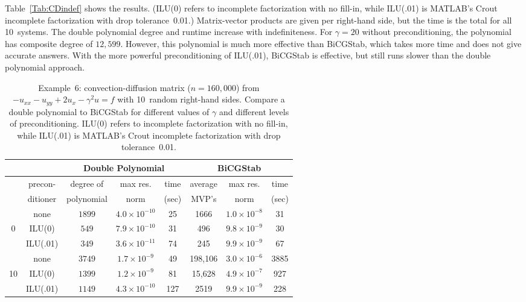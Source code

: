 \documentclass{siamart}
\begin{document}
Table~\ref{Tab:CDindef} shows the results.  (ILU(0) refers to incomplete factorization with no fill-in, while ILU(.01) is MATLAB's Crout incomplete factorization with drop tolerance~0.01.)
Matrix-vector products are given per right-hand side, but the time is the total for all 10~systems.
The double polynomial degree and runtime increase with indefiniteness.  For $\gamma=20$ without preconditioning, the polynomial has composite degree of $12{,}599$.  However, this polynomial is much more effective than BiCGStab, which takes more time and does not give accurate answers.  With the more powerful preconditioning of ILU(.01), BiCGStab is effective, but still runs slower than the double polynomial approach.  

\begin{table}
\caption{Example~6: convection-diffusion matrix ($n=160{,}000$) from $- u_{xx} - u_{yy} + 2 u_{x} - \gamma^2 u = f $ with 10~random right-hand sides.  Compare  a double polynomial to BiCGStab for different values of $\gamma$ and different levels of preconditioning.  ILU(0) refers to incomplete factorization with no fill-in, while ILU(.01) is MATLAB's Crout incomplete factorization with drop tolerance~0.01.}

\vspace*{-3pt}
\begin{center}
\begin{tabular}{|c|c|c|c|c||c|c|c|}  \hline\hline
& & \multicolumn{3}{|c||}{Double Polynomial}                  &  \multicolumn{3}{|c|}{BiCGStab }              \\  \hline
\smash{\raisebox{-5pt}{$\gamma$}} & precon-  & degree of    & max res.          & time          & average       & max res.          & time      \\ 
                          & ditioner             & polynomial    & norm              & \small{(sec)}     & MVP's         & norm              & \small{(sec)}   \\ \hline \hline
 & none         & $1899$   & $4.0\times10^{-10}$    & 25           & 1666           & $1.0\times10^{-8}$     & 31       \\ \cline{2-8}
0 & ILU(0)       & $549$   & $7.9\times10^{-10}$    & 31           & 496           & $9.8\times10^{-9}$     & 30       \\ \cline{2-8}
 & ILU(.01)     & $349$   & $3.6\times10^{-11}$    & 74           & 245           & $9.9\times10^{-9}$     & 67       \\ \hline \hline
 & none        & $3749$  & $1.7\times10^{-9}$     & 49           & 198{,}106     & $3.0\times10^{-6}$     & 3885       \\ \cline{2-8}
10 & ILU(0)      & $1399$  & $1.2\times10^{-9}$     & 81           & 15{,}628     & $4.9\times10^{-7}$     & 927       \\ \cline{2-8}
 & ILU(.01)     & $1149$  & $4.3\times10^{-10}$     & 127           & 2519     & $9.9\times10^{-9}$     & 228       \\ \hline \hline


\end{tabular}
\end{center}
\end{table}
\end{document}
